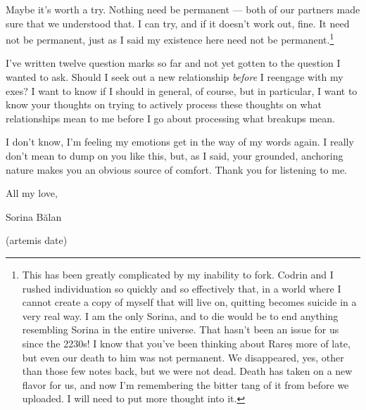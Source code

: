 Maybe it's worth a try. Nothing need be permanent — both of our partners made sure that we understood that. I can try, and if it doesn't work out, fine. It need not be permanent, just as I said my existence here need not be permanent.\footnote{This has been greatly complicated by my inability to fork. Codrin and I rushed individuation so quickly and so effectively that, in a world where I cannot create a copy of myself that will live on, quitting becomes suicide in a very real way. I am the only Sorina, and to die would be to end anything resembling Sorina in the entire universe. That hasn't been an issue for us since the 2230s! I know that you've been thinking about Rareș more of late, but even our death to him was not permanent. We disappeared, yes, other than those few notes back, but we were not dead. Death has taken on a new flavor for us, and now I'm remembering the bitter tang of it from before we uploaded. I will need to put more thought into it.}

I've written twelve question marks so far and not yet gotten to the question I wanted to ask. Should I seek out a new relationship \emph{before} I reengage with my exes? I want to know if I should in general, of course, but in particular, I want to know your thoughts on trying to actively process these thoughts on what relationships mean to me before I go about processing what breakups mean.

I don't know, I'm feeling my emotions get in the way of my words again. I really don't mean to dump on you like this, but, as I said, your grounded, anchoring nature makes you an obvious source of comfort. Thank you for listening to me.

All my love,

Sorina Bălan

(artemis date)
